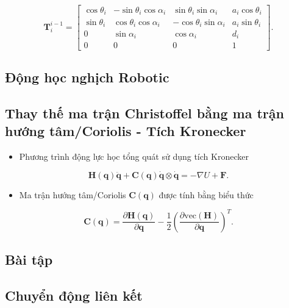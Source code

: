 \begin{equation}
    \mathbf{T}_i^{i-1} =
    \left[ \begin{array}{cccc}
    \cos\theta_i & -\sin\theta_i \cos\alpha_i & \sin\theta_i \sin\alpha_i & a_i \cos\theta_i \\
    \sin\theta_i & \cos\theta_i \cos\alpha_i & -\cos\theta_i \sin\alpha_i & a_i \sin\theta_i \\
    0 & \sin\alpha_i & \cos\alpha_i & d_i \\
    0 & 0 & 0 & 1
    \end{array} \right].
\end{equation}

\subsection{Động học nghịch Robotic}

\subsection{Thay thế ma trận Christoffel bằng ma trận hướng tâm/Coriolis - Tích Kronecker}

\begin{itemize}
        \item Phương trình động lực học tổng quát sử dụng tích Kronecker \cite{tuan2019kinematic}
    \end{itemize}
    \begin{equation}
        \mathbf{H}(\mathbf{q}) \mathbf{\ddot{q}} + \mathbf{C}(\mathbf{q}) \mathbf{\dot{q}} \otimes \mathbf{\dot{q}} = - \nabla U + \mathbf{F}.
    \end{equation}
    \begin{itemize}
        \item Ma trận hướng tâm/Coriolis \(\mathbf{C}(\mathbf{q})\) được tính bằng biểu thức
    \end{itemize}
    \begin{equation}
        \mathbf{C}(\mathbf{q}) = \dfrac{\partial \mathbf{H}(\mathbf{q})}{\partial \mathbf{q}} - \dfrac{1}{2} \left( \dfrac{\partial \text{vec}(\mathbf{H})}{\partial \mathbf{q}} \right)^T.
    \end{equation}

\subsection{Bài tập}
\subsection*{Chuyển động liên kết}

